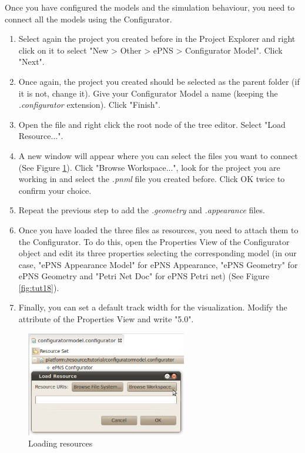 Once you have configured the models and the simulation behaviour, you need to connect all the models using the Configurator. 
\begin{enumerate}
  \item Select again the project you created before in the Project Explorer and right click on it to select "New > Other > ePNS > 
  Configurator Model". Click "Next".
  \item Once again, the project you created should be selected as the parent folder (if it is not, change it). Give your Configurator 
  Model a name (keeping the \textit{.configurator} extension). Click "Finish".
  \item Open the file and right click the root node of the tree editor. Select "Load Resource...".
  \item A new window will appear where you can select the files you want to connect (See Figure \ref{fig:tut17}). Click "Browse Workspace...", 
  look for the project you are working in and select the \textit{.pnml} file you created before. Click OK twice to confirm your choice.
  \item Repeat the previous step to add the \textit{.geometry} and \textit{.appearance} files. 
  \item Once you have loaded the three files as resources, you need to attach them to the Configurator. To do this, open the Properties
  View of the Configurator object and edit its three properties selecting the corresponding model (in our case, "ePNS Appearance Model" 
  for ePNS Appearance, "ePNS Geometry" for ePNS Geometry and "Petri Net Doc" for ePNS Petri net) (See Figure \ref{fig:tut18}).
  \item Finally, you can set a default track width for the visualization. Modify the attribute of the Properties View and write "5.0".
\end{enumerate}

\begin{figure}[htp]
\begin{center}
  \includegraphics[width=7.0cm]{image/tutorial/Tutorial_17.png}
  \caption{Loading resources}
  \label{fig:tut17}
\end{center}
\end{figure}

